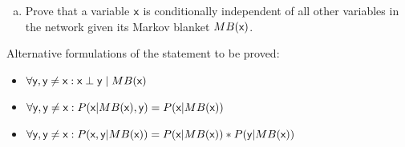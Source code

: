 \documentclass[12pt,a4paper,oneside]{article}
\newtheorem{thm}{Theorem}
\begin{document}
\begin{enumerate}[a)]
\item Prove that a variable $\rv{x}$ is conditionally independent of all other
  variables in the network given its Markov blanket $MB(\rv{x})$.
\end{enumerate}

\noindent
Alternative formulations of the statement to be proved:
\begin{itemize}
\item $\forall \rv{y}, \rv{y} \neq \rv{x}: \rv{x} \perp \rv{y} \; | \; MB(\rv{x})$
\item $\forall \rv{y}, \rv{y} \neq \rv{x}: P(\rv{x}|MB(\rv{x}),\rv{y}) = P(\rv{x}|MB(\rv{x}))$
\item $\forall \rv{y}, \rv{y} \neq \rv{x}: P(\rv{x},\rv{y}|MB(\rv{x})) = P(\rv{x}|MB(\rv{x}))*P(\rv{y}|MB(\rv{x}))$
\end{itemize}

\end{document}

